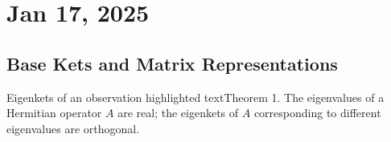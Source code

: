 \section{Jan 17, 2025}
\subsection{Base Kets and Matrix Representations}
\begin{frame}{Eigenkets of an observation}
	\alert{highlighted text}Theorem 1. The eigenvalues of a Hermitian operator $A$ are real; the eigenkets of $A$ corresponding to different eigenvalues are orthogonal.
\end{frame}
